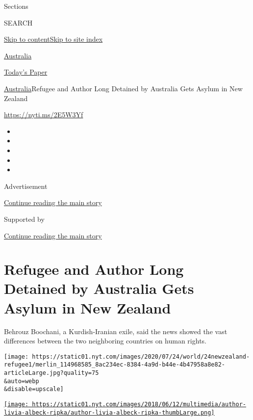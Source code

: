 Sections

SEARCH

\protect\hyperlink{site-content}{Skip to
content}\protect\hyperlink{site-index}{Skip to site index}

\href{https://www.nytimes.com/section/world/australia}{Australia}

\href{https://myaccount.nytimes.com/auth/login?response_type=cookie\&client_id=vi}{}

\href{https://www.nytimes.com/section/todayspaper}{Today's Paper}

\href{/section/world/australia}{Australia}\textbar{}Refugee and Author
Long Detained by Australia Gets Asylum in New Zealand

\url{https://nyti.ms/2E5W3Yf}

\begin{itemize}
\item
\item
\item
\item
\item
\end{itemize}

Advertisement

\protect\hyperlink{after-top}{Continue reading the main story}

Supported by

\protect\hyperlink{after-sponsor}{Continue reading the main story}

\hypertarget{refugee-and-author-long-detained-by-australia-gets-asylum-in-new-zealand}{%
\section{Refugee and Author Long Detained by Australia Gets Asylum in
New
Zealand}\label{refugee-and-author-long-detained-by-australia-gets-asylum-in-new-zealand}}

Behrouz Boochani, a Kurdish-Iranian exile, said the news showed the vast
differences between the two neighboring countries on human rights.

\texttt{[image: https://static01.nyt.com/images/2020/07/24/world/24newzealand-refugee1/merlin\_114968585\_8ac234ec-8384-4a9d-b44e-4b47958a8e82-articleLarge.jpg?quality=75\\\&auto=webp\\\&disable=upscale]}

\href{https://www.nytimes.com/by/livia-albeck-ripka}{\texttt{[image: https://static01.nyt.com/images/2018/06/12/multimedia/author-livia-albeck-ripka/author-livia-albeck-ripka-thumbLarge.png]}}

